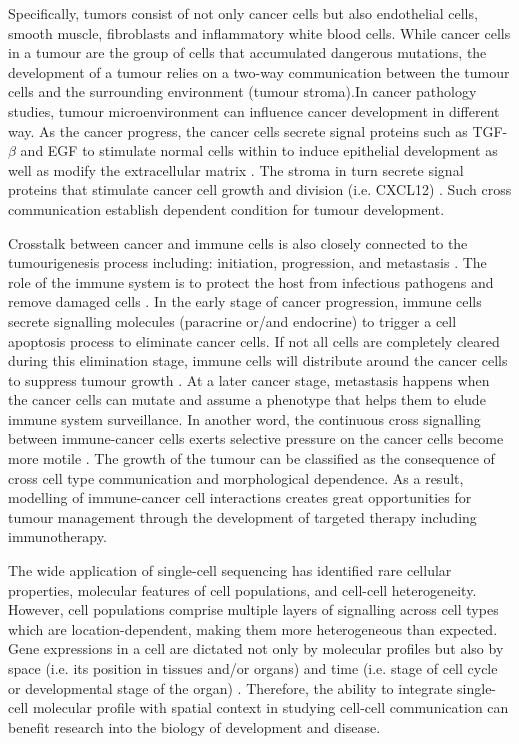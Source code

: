 Specifically, tumors consist of not only cancer cells but also endothelial cells, smooth muscle, fibroblasts and inflammatory white blood cells. While cancer cells in a tumour are the group of cells that accumulated dangerous mutations, the development of a tumour relies on a two-way communication between the tumour cells and the surrounding environment (tumour stroma).In cancer pathology studies, tumour microenvironment can influence cancer development in different way. As the cancer progress, the cancer cells secrete signal proteins such as TGF-$\beta$ and EGF to stimulate normal cells within  to induce epithelial development as well as modify the extracellular matrix \cite{beck2011systematic,BREMNES2011209}. The stroma in turn secrete signal proteins that stimulate cancer cell growth and division (i.e. CXCL12) \cite{kumar2018analysis,wang2017role}. Such cross communication establish dependent condition for tumour development.   

Crosstalk between cancer and immune cells is also closely connected to the tumourigenesis process including: initiation, progression, and metastasis \cite{wang2017role}. The role of the immune system is to protect the host from infectious pathogens and remove damaged cells \cite{davis2007molecular}. In the early stage of cancer progression, immune cells secrete signalling molecules (paracrine or/and endocrine) to trigger a cell apoptosis process to eliminate cancer cells. If not all cells are completely cleared during this elimination stage, immune cells will distribute around the cancer cells to suppress tumour growth \cite{bronkhorst2011detection, ly2010aged}. At a later cancer stage, metastasis happens when the cancer cells can mutate and assume a phenotype that helps them to elude immune system surveillance. In another word, the continuous cross signalling between immune-cancer cells exerts selective pressure on the cancer cells become more motile \cite{giampieri2009localized,ilina2009mechanisms}. The growth of the tumour can be classified as the consequence of cross cell type communication and morphological dependence. As a result, modelling of immune-cancer cell interactions creates great opportunities for tumour management through the development of targeted therapy including immunotherapy.


The wide application of single-cell sequencing has identified rare cellular properties, molecular features of cell populations, and cell-cell heterogeneity. However, cell populations comprise multiple layers of signalling across cell types which are location-dependent, making them more heterogeneous than expected. Gene expressions in a cell are dictated not only by molecular profiles but also by space (i.e. its position in tissues and/or organs) and time (i.e. stage of cell cycle or developmental stage of the organ) \cite{salomon2020genomic}. Therefore, the ability to integrate single-cell molecular profile with spatial context in studying cell-cell communication can benefit research into the biology of development and disease.


